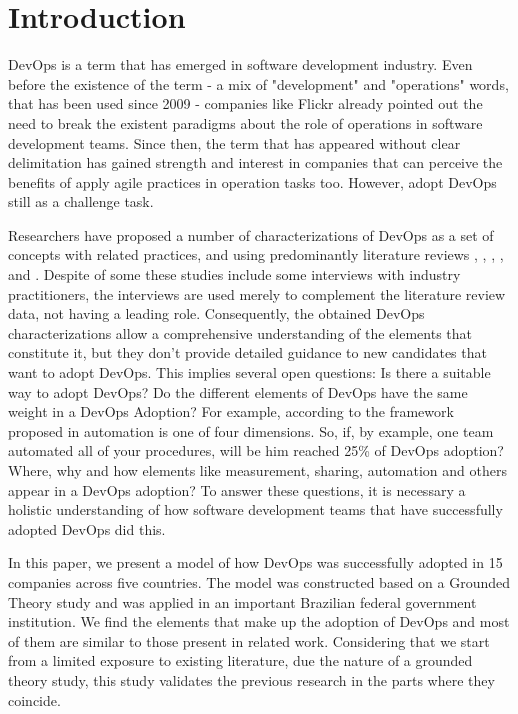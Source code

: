 \section{Introduction}

DevOps is a term that has emerged in software development industry. Even before
the existence of the term - a mix of "development" and "operations" words, that
has been used since 2009 - companies like Flickr \cite{flickr} already
pointed out the need to break the existent paradigms about the role of
operations in software development teams. Since then, the term that has appeared
without clear delimitation has gained strength and interest in companies that
can perceive the benefits of apply agile practices in operation tasks too.
However, adopt DevOps still as a challenge task.

Researchers have proposed a number of characterizations of DevOps as a set of concepts with related practices, and using predominantly literature reviews \cite{cooperation_dev_ops_esem_2014}, \cite{devops_a_definition_xp_15}, \cite{dimensions_of_devops_xp_15}, \cite{extending_dimensions_icsea_16}, \cite{characterizing_devops_sbes_2016} and \cite{qualitative_devops_journalsw_17}. Despite of some these studies include some interviews with industry practitioners, the interviews are used merely to complement the literature review data, not having a leading role. Consequently, the obtained DevOps characterizations allow a comprehensive understanding of the elements that constitute it, but they don't provide detailed guidance to new candidates that want to adopt DevOps. This implies several open questions: Is there a suitable way to adopt DevOps? Do the different elements of DevOps have the same weight in a DevOps Adoption? For example, according to the framework proposed in \cite{dimensions_of_devops_xp_15} automation is one of four dimensions. So, if, by example, one team automated all of your procedures, will be him reached 25\% of DevOps adoption? Where, why and how elements like measurement, sharing, automation and others appear in a DevOps adoption? To answer these questions, it is necessary a holistic understanding of how software development teams that have successfully adopted DevOps did this.

In this paper, we present a model of how DevOps was successfully adopted in 15 companies across five countries. The model was constructed based on a Grounded Theory study and was applied in an important Brazilian federal government institution. We find the elements that make up the adoption of DevOps and most of them are similar to those present in related work. Considering that we start from a limited exposure to existing literature, due the nature of a grounded theory study, this study validates the previous research in the parts where they coincide.

